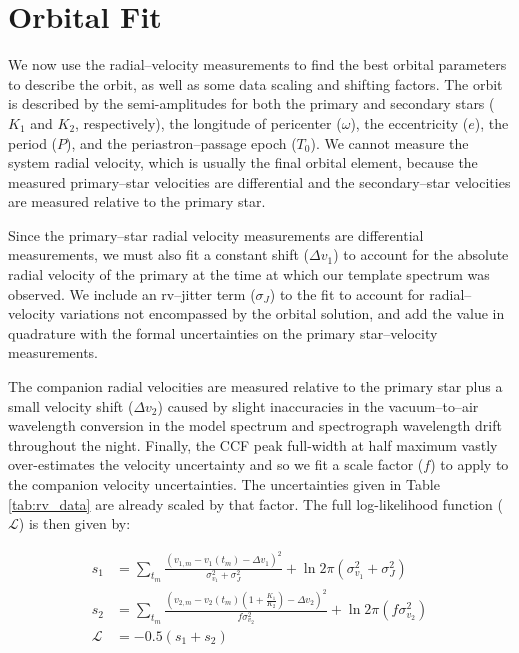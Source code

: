 \documentclass[twocolumn]{emulateapj}
\begin{document}
\section{Orbital Fit}
\label{sec:orbit}

We now use the radial--velocity measurements to find the best orbital parameters to describe the orbit, as well as some data scaling and shifting factors. The orbit is described by the semi-amplitudes for both the primary and secondary stars ($K_1$ and $K_2$, respectively), the longitude of pericenter ($\omega$), the eccentricity ($e$), the period ($P$), and the periastron--passage epoch ($T_0$). We cannot measure the system radial velocity, which is usually the final orbital element, because the measured primary--star velocities are differential and the secondary--star velocities are measured relative to the primary star.

Since the primary--star radial velocity measurements are differential measurements, we must also fit a constant shift ($\Delta v_1$) to account for the absolute radial velocity of the primary at the time at which our template spectrum was observed. We include an rv--jitter term ($\sigma_J$) to the fit to account for radial--velocity variations not encompassed by the orbital solution, and add the value in quadrature with the formal uncertainties on the primary star--velocity measurements. 

The companion radial velocities are measured relative to the primary star plus a small velocity shift ($\Delta v_2$) caused by slight inaccuracies in the vacuum--to--air wavelength conversion in the model spectrum and spectrograph wavelength drift throughout the night. Finally, the CCF peak full-width at half maximum vastly over-estimates the velocity uncertainty and so we fit a scale factor ($f$) to apply to the companion velocity uncertainties. The uncertainties given in Table \ref{tab:rv_data} are already scaled by that factor. The full log-likelihood function ($\mathcal{L}$) is then given by:

\begin{align*}
s_1 &= \sum_{t_m} \frac{(v_{1,m} - v_1(t_m) - \Delta v_1)^2 }{\sigma_{v_1}^2 + \sigma_J^2} + \ln{2\pi(\sigma_{v_1}^2 + \sigma_J^2)} \\
s_2 &= \sum_{t_m} \frac{(v_{2,m} - v_2(t_m)(1+\frac{K_1}{K_2}) - \Delta v_2)^2}{f\sigma_{v_2}^2 } + \ln{2\pi(f\sigma_{v_2}^2)} \\ 
\mathcal{L} &= -0.5(s_1 + s_2) \\
\end{align*}
\end{document}
